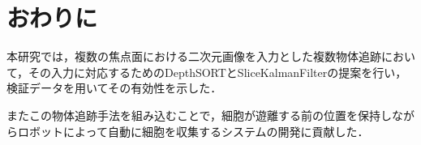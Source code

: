 \section{おわりに}

本研究では，複数の焦点面における二次元画像を入力とした複数物体追跡において，その入力に対応するためのDepthSORTとSliceKalmanFilterの提案を行い，検証データを用いてその有効性を示した．

またこの物体追跡手法を組み込むことで，細胞が遊離する前の位置を保持しながらロボットによって自動に細胞を収集するシステムの開発に貢献した．